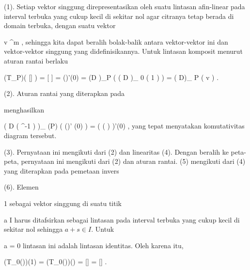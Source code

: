 {

\teilbeweis {}{}{}
{(1). Setiap vektor singgung direpresentasikan oleh suatu lintasan afin-linear pada interval terbuka yang cukup kecil di sekitar nol agar citranya tetap berada di domain terbuka,
dengan suatu vektor

\mavergleichskette
{\vergleichskette
{v
}
{ \in }{\R^m
}
{  }{
}
{    }{
}
{   }{
}
}
{}{}{,}
sehingga kita dapat beralih bolak-balik antara vektor-vektor ini dan vektor-vektor singgung yang didefinisikannya. Untuk lintasan komposit
\mathl{\varphi \circ \gamma}{}
menurut
aturan rantai
berlaku

\mavergleichskettedisp
{\vergleichskette
{ (T_P\varphi )( [\gamma ] )
}
{ =} { [ \varphi \circ \gamma ]
}
{ =} { (\varphi \circ \gamma)'(0)
}
{ =} { (D \varphi)_P \left( \left(  D \gamma  \right)_{ 0 } \left(   1  \right) \right)
}
{ =} { \left(  D\varphi  \right)_{ P } \left(  v  \right)
}
}
{}{}{.}}
{}
\teilbeweis {}{}{}
{(2). Aturan rantai yang diterapkan pada
 {} {}

 {  }

menghasilkan

\mavergleichskettedisp
{\vergleichskette
{ \left(  D   \left(   \beta \circ \varphi \circ \alpha^{-1}    \right)      \right)_{ \alpha(P)} \left(   (\alpha \circ \gamma)' (0)    \right)
}
{ =} { ( \beta \circ ( \varphi \circ \gamma) )'(0)
}
{ } {
}
{ } {
}
{ } {
}
}
{}{}{,}
yang tepat menyatakan komutativitas diagram tersebut.}
{}
\teilbeweis {}{}{}
{(3). Pernyataan ini mengikuti dari (2) dan linearitas
}
{}
\teilbeweis {}{}{}
{(4). Dengan beralih ke peta-peta, pernyataan ini mengikuti dari (2) dan aturan rantai.}
{}
\teilbeweis {}{}{}
{(5) mengikuti dari (4) yang diterapkan pada pemetaan invers
}
{}
\teilbeweis {}{}{}
{(6). Elemen

\mavergleichskette
{\vergleichskette
{ 1
}
{ \in }{\R
}
{  }{
}
{    }{
}
{   }{
}
}
{}{}{}
sebagai vektor singgung di suatu titik

\mavergleichskette
{\vergleichskette
{a
}
{ \in }{ I
}
{  }{
}
{    }{
}
{   }{
}
}
{}{}{}
harus ditafsirkan sebagai lintasan
pada interval terbuka yang cukup kecil di sekitar nol sehingga $a+s\in I$.
Untuk

\mavergleichskette
{\vergleichskette
{a
}
{ = }{ 0
}
{  }{
}
{    }{
}
{   }{
}
}
{}{}{}
lintasan ini adalah lintasan identitas. Oleh karena itu,

\mavergleichskettedisp
{\vergleichskette
{ (T_0(\gamma))(1)
}
{ =} { (T_0(\gamma))()
}
{ =} { [\gamma \circ {}]
}
{ =} { [\gamma ]
}
{ } {
}
}
{}{}{.}}
{}

}

